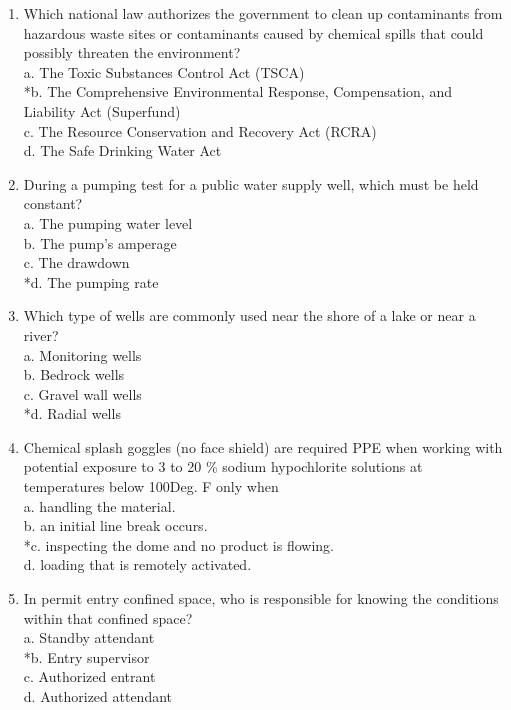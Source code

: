 \begin{enumerate}[1.]
 \item Which national law authorizes the government to clean up contaminants from hazardous waste sites or contaminants caused by chemical spills that could possibly threaten the environment?\\
a. The Toxic Substances Control Act (TSCA)\\
*b. The Comprehensive Environmental Response, Compensation, and Liability Act (Superfund)\\
c. The Resource Conservation and Recovery Act (RCRA)\\
d. The Safe Drinking Water Act\\


  \item During a pumping test for a public water supply well, which must be held constant?\\
a. The pumping water level\\
b. The pump's amperage\\
c. The drawdown\\
*d. The pumping rate\\

  \item Which type of wells are commonly used near the shore of a lake or near a river?\\
a. Monitoring wells\\
b. Bedrock wells\\
c. Gravel wall wells\\
*d. Radial wells\\

  \item Chemical splash goggles (no face shield) are required PPE when working with potential exposure to 3 to 20 \% sodium hypochlorite solutions at temperatures below 100Deg. F only when\\
a. handling the material.\\
b. an initial line break occurs.\\
*c. inspecting the dome and no product is flowing.\\
d. loading that is remotely activated.\\

  \item In permit entry confined space, who is responsible for knowing the conditions within that confined space?\\
a. Standby attendant\\
*b. Entry supervisor\\
c. Authorized entrant\\
d. Authorized attendant\\


\end{enumerate}
